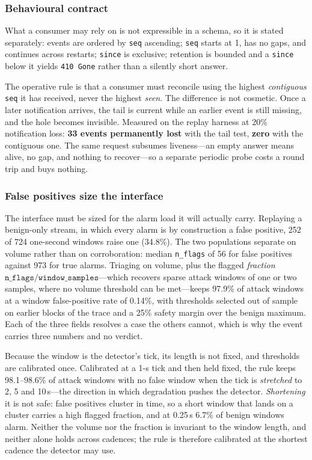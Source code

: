 \subsubsection{Behavioural contract}

What a consumer may rely on is not expressible in a schema, so it is stated separately:
events are ordered by \texttt{seq} ascending; \texttt{seq} starts at 1, has no gaps, and
continues across restarts; \texttt{since} is exclusive; retention is bounded and a
\texttt{since} below it yields \texttt{410 Gone} rather than a silently short answer.

The operative rule is that a consumer must reconcile using the highest \emph{contiguous}
\texttt{seq} it has received, never the highest \emph{seen}. The difference is not
cosmetic. Once a later notification arrives, the tail is current while an earlier event is
still missing, and the hole becomes invisible. Measured on the replay harness at 20\%
notification loss: \textbf{33 events permanently lost} with the tail test, \textbf{zero}
with the contiguous one. The same request subsumes liveness---an empty answer means alive,
no gap, and nothing to recover---so a separate periodic probe costs a round trip and buys
nothing.

\subsubsection{False positives size the interface}
\label{sec:api-fp}

The interface must be sized for the alarm load it will actually carry. Replaying a
benign-only stream, in which every alarm is by construction a false positive, 252 of 724
one-second windows raise one (34.8\%). The two populations separate on volume rather than
on corroboration: median \texttt{n\_flags} of 56 for false positives against 973 for true
alarms. Triaging on volume, plus the flagged \emph{fraction}
$\texttt{n\_flags}/\texttt{window\_samples}$---which recovers sparse attack windows of one
or two samples, where no volume threshold can be met---keeps 97.9\% of attack windows at a
window false-positive rate of 0.14\%, with thresholds selected out of sample on earlier
blocks of the trace and a 25\% safety margin over the benign maximum. Each of the three
fields resolves a case the others cannot, which is why the event carries three numbers and
no verdict.

Because the window is the detector's tick, its length is not fixed, and thresholds are
calibrated once. Calibrated at a 1-s tick and then held fixed, the rule keeps 98.1--98.6\%
of attack windows with no false window when the tick is \emph{stretched} to 2, 5 and
10\,s---the direction in which degradation pushes the detector. \emph{Shortening} it is not
safe: false positives cluster in time, so a short window that lands on a cluster carries a
high flagged fraction, and at 0.25\,s 6.7\% of benign windows alarm. Neither the volume nor
the fraction is invariant to the window length, and neither alone holds across cadences;
the rule is therefore calibrated at the shortest cadence the detector may use.

